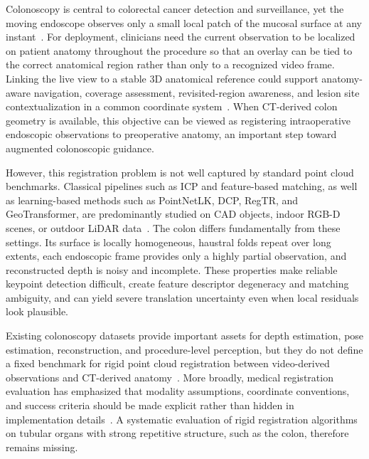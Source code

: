 \documentclass{bmvc2k}
\begin{document}
Colonoscopy is central to colorectal cancer detection and surveillance, yet the moving endoscope observes only a small local patch of the mucosal surface at any instant~\cite{ma2021rnnslam,yao2021motion}. For deployment, clinicians need the current observation to be localized on patient anatomy throughout the procedure so that an overlay can be tied to the correct anatomical region rather than only to a recognized video frame. Linking the live view to a stable 3D anatomical reference could support anatomy-aware navigation, coverage assessment, revisited-region awareness, and lesion site contextualization in a common coordinate system~\cite{bobrow2023colonoscopy,ma2021rnnslam,yao2021motion,nayor2017endoscopic}. When CT-derived colon geometry is available, this objective can be viewed as registering intraoperative endoscopic observations to preoperative anatomy, an important step toward augmented colonoscopic guidance.

However, this registration problem is not well captured by standard point cloud benchmarks. Classical pipelines such as ICP and feature-based matching, as well as learning-based methods such as PointNetLK, DCP, RegTR, and GeoTransformer, are predominantly studied on CAD objects, indoor RGB-D scenes, or outdoor LiDAR data~\cite{pomerleau2015review,huang2021comprehensive}. The colon differs fundamentally from these settings. Its surface is locally homogeneous, haustral folds repeat over long extents, each endoscopic frame provides only a highly partial observation, and reconstructed depth is noisy and incomplete. These properties make reliable keypoint detection difficult, create feature descriptor degeneracy and matching ambiguity, and can yield severe translation uncertainty even when local residuals look plausible.

Existing colonoscopy datasets provide important assets for depth estimation, pose estimation, reconstruction, and procedure-level perception, but they do not define a fixed benchmark for rigid point cloud registration between video-derived observations and CT-derived anatomy~\cite{bobrow2023colonoscopy,lena2026realsyncol,rau2024simcol3d,biffi2024realcolon,ju2024segcol}. More broadly, medical registration evaluation has emphasized that modality assumptions, coordinate conventions, and success criteria should be made explicit rather than hidden in implementation details~\cite{maier2013optical,haskins2020deep}. A systematic evaluation of rigid registration algorithms on tubular organs with strong repetitive structure, such as the colon, therefore remains missing.
\end{document}
